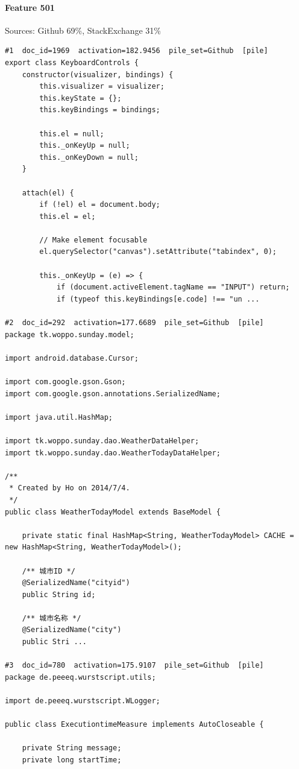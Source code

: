 \paragraph*{Feature 501} Sources: Github 69\%, StackExchange 31\%

\begin{verbatim}
#1  doc_id=1969  activation=182.9456  pile_set=Github  [pile]
export class KeyboardControls {
    constructor(visualizer, bindings) {
        this.visualizer = visualizer;
        this.keyState = {};
        this.keyBindings = bindings;

        this.el = null;
        this._onKeyUp = null;
        this._onKeyDown = null;
    }

    attach(el) {
        if (!el) el = document.body;
        this.el = el;

        // Make element focusable
        el.querySelector("canvas").setAttribute("tabindex", 0);

        this._onKeyUp = (e) => {
            if (document.activeElement.tagName == "INPUT") return;
            if (typeof this.keyBindings[e.code] !== "un ...

#2  doc_id=292  activation=177.6689  pile_set=Github  [pile]
package tk.woppo.sunday.model;

import android.database.Cursor;

import com.google.gson.Gson;
import com.google.gson.annotations.SerializedName;

import java.util.HashMap;

import tk.woppo.sunday.dao.WeatherDataHelper;
import tk.woppo.sunday.dao.WeatherTodayDataHelper;

/**
 * Created by Ho on 2014/7/4.
 */
public class WeatherTodayModel extends BaseModel {

    private static final HashMap<String, WeatherTodayModel> CACHE = new HashMap<String, WeatherTodayModel>();

    /** 城市ID */
    @SerializedName("cityid")
    public String id;

    /** 城市名称 */
    @SerializedName("city")
    public Stri ...

#3  doc_id=780  activation=175.9107  pile_set=Github  [pile]
package de.peeeq.wurstscript.utils;

import de.peeeq.wurstscript.WLogger;

public class ExecutiontimeMeasure implements AutoCloseable {

    private String message;
    private long startTime;


\end{verbatim}
